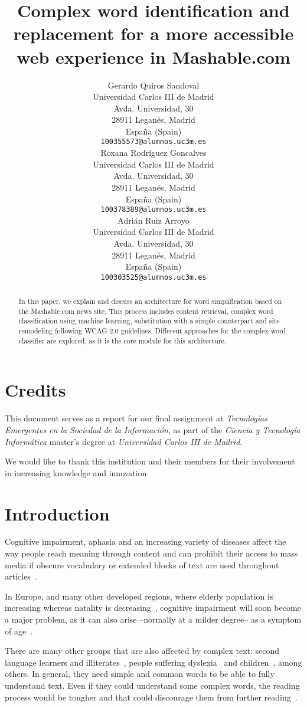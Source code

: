 \documentclass[11pt,a4paper]{article}
\title{Complex word identification and replacement for a more accessible web experience in Mashable.com}
\author{Gerardo Quiros Sandoval \\
  Universidad Carlos III de Madrid \\
  Avda. Universidad, 30 \\
  28911 Leganés, Madrid \\
  España (Spain) \\
  {\tt 100355573@alumnos.uc3m.es} \\\And
  Roxana Rodríguez Goncalves \\
  Universidad Carlos III de Madrid \\
  Avda. Universidad, 30 \\
  28911 Leganés, Madrid \\
  España (Spain) \\
  {\tt 100378389@alumnos.uc3m.es} \\\AND
  Adrián Ruiz Arroyo \\
  Universidad Carlos III de Madrid \\
  Avda. Universidad, 30 \\
  28911 Leganés, Madrid \\
  España (Spain) \\
  {\tt 100303525@alumnos.uc3m.es} \\}
\date{}
\begin{document}
\maketitle

\begin{abstract}
In this paper, we explain and discuss an architecture for word simplification based on the Mashable.com news site. This process includes content retrieval, complex word classification using machine learning, substitution with a simple counterpart and site remodeling following WCAG 2.0 guidelines. Different approaches for the complex word classifier are explored, as it is the core module for this architecture.
\end{abstract}

\section{Credits}

This document serves as a report for our final assignment at \emph{Tecnologías Emergentes en la Sociedad de la Información}, as part of the \emph{Ciencia y Tecnología Informática} master’s degree at \emph{Universidad Carlos III de Madrid}.

We would like to thank this institution and their members for their involvement in increasing knowledge and innovation.

\section{Introduction}

Cognitive impairment, aphasia and an increasing variety of diseases affect the way people reach meaning through content and can prohibit their access to mass media if obscure vocabulary or extended blocks of text are used throughout articles~\cite{feng2008text}.

In Europe, and many other developed regions, where elderly population is increasing whereas natality is decreasing~\cite{hoff2011population}, cognitive impairment will soon become a major problem, as it can also arise –normally at a milder degree– as a symptom of age~\cite{butler2004maintaining}.

There are many other groups that are also affected by complex text: second language learners and illiterates~\cite{petersen2007text}, people suffering dyslexia~\cite{rello2013simplify} and children~\cite{de2010text}, among others. In general, they need simple and common words to be able to fully understand text. Even if they could understand some complex words, the reading process would be tougher and that could discourage them from further reading~\cite{ediger2002reading}.
\end{document}
